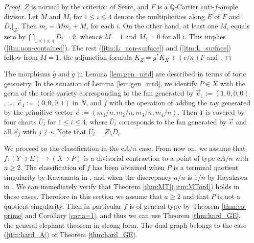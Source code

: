 \documentclass[a4paper,11pt]{amsart}
\theoremstyle{definition}
\theoremstyle{remark}
\numberwithin{equation}{section}
\newcommand{\bQ}{{\mathbb Q}}
\begin{document}
\begin{proof}
$Z$ is normal by the criterion of Serre,
and $F$ is a $\bQ$-Cartier anti-$f$-ample divisor.
Let $M$ and $M_i$ for $1\le i\le 4$ denote
the multiplicities along $E$ of $F$ and $\bar{D}_i|_Z$.
Then $m_i=Mm_i+M_i$ for each $i$.
On the other hand, at least one $M_i$ equals zero
by $\bigcap_{1 \le i \le 4} \bar{D}_i=\emptyset$,
whence $M=1$ and $M_i=0$ for all $i$.
This implies (\ref{itm:non-contained}).
The rest (\ref{itm:L_non-surface}) and (\ref{itm:L_surface}) follow from $M=1$,
the adjunction formula $K_Z=g^*K_X+(c/n)F$ and \cite[Lemma 3.4]{Ka01}.
\end{proof}

The morphisms $\bar{g}$ and $g$ in Lemma \ref{lem:gen_mtd} are
described in terms of toric geometry.
In the situation of Lemma \ref{lem:gen_mtd},
we identify $P \in \bar{X}$ with the germ of the toric variety
corresponding to the fan generated by
$\vec{e}_1:=(1,0,0,0)$, \ldots, $\vec{e}_4:=(0,0,0,1)$ in $N$,
and $\bar{f}$ with the operation of adding the ray generated
by the primitive vector $\vec{e}:=(m_1/n,m_2/n,m_3/n,m_4/n)$.
Then $\bar{Y}$ is covered by four charts $\bar{U}_i$ for $1\le i\le 4$,
where $\bar{U}_i$ corresponds to the fan generated by
$\vec{e}$ and all $\vec{e}_j$ with $j\neq i$.
Note that $\bar{U}_i=\bar{Z} \setminus \bar{D}_i$.

We proceed to the classification in the c$A/n$ case.
From now on,
we assume that $f \colon (Y \supset E) \to (X \ni P)$ is
a divisorial contraction to a point of type c$A/n$ with $n \ge 2$.
The classification of $f$ has been obtained
when $P$ is a terminal quotient singularity by Kawamata in \cite{Km96},
and when the discrepancy $a/n$ is $1/n$
by Hayakawa in \cite[Theorem 6.4]{Ha99}.
We can immediately verify that
Theorem \ref{thm:MT}(\ref{itm:MTord}) holds in these cases.
Therefore in this section
we assume that $a\ge2$ and that $P$ is not a quotient singularity.
Then in particular $f$ is of general type by
Theorem \ref{thm:co-prime} and Corollary \ref{cor:a=1},
and thus we can use Theorem \ref{thm:hard_GE},
the general elephant theorem in strong form.
The dual graph belongs to
the case (\ref{itm:hard_A}) of Theorem \ref{thm:hard_GE}.
\end{document}
